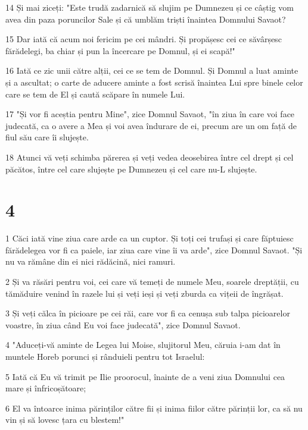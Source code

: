 \par 14 Și mai ziceți: "Este trudă zadarnică să slujim pe Dumnezeu și ce câștig vom avea din paza poruncilor Sale și că umblăm triști înaintea Domnului Savaot?
\par 15 Dar iată că acum noi fericim pe cei mândri. Și propășesc cei ce săvârșesc fărădelegi, ba chiar și pun la încercare pe Domnul, și ei scapă!"
\par 16 Iată ce zic unii către alții, cei ce se tem de Domnul. Și Domnul a luat aminte și a ascultat; o carte de aducere aminte a fost scrisă înaintea Lui spre binele celor care se tem de El și caută scăpare în numele Lui.
\par 17 "Și vor fi aceștia pentru Mine", zice Domnul Savaot, "în ziua în care voi face judecată, ca o avere a Mea și voi avea îndurare de ei, precum are un om față de fiul său care îi slujește.
\par 18 Atunci vă veți schimba părerea și veți vedea deosebirea între cel drept și cel păcătos, între cel care slujește pe Dumnezeu și cel care nu-L slujește.

\chapter{4}

\par 1 Căci iată vine ziua care arde ca un cuptor. Și toți cei trufași și care făptuiesc fărădelegea vor fi ca paiele, iar ziua care vine îi va arde", zice Domnul Savaot. "Și nu va rămâne din ei nici rădăcină, nici ramuri.
\par 2 Și va răsări pentru voi, cei care vă temeți de numele Meu, soarele dreptății, cu tămăduire venind în razele lui și veți ieși și veți zburda ca vițeii de îngrășat.
\par 3 Și veți călca în picioare pe cei răi, care vor fi ca cenușa sub talpa picioarelor voastre, în ziua când Eu voi face judecată", zice Domnul Savaot.
\par 4 "Aduceți-vă aminte de Legea lui Moise, slujitorul Meu, căruia i-am dat în muntele Horeb porunci și rânduieli pentru tot Israelul:
\par 5 Iată că Eu vă trimit pe Ilie proorocul, înainte de a veni ziua Domnului cea mare și înfricoșătoare;
\par 6 El va întoarce inima părinților către fii și inima fiilor către părinții lor, ca să nu vin și să lovesc țara cu blestem!"


